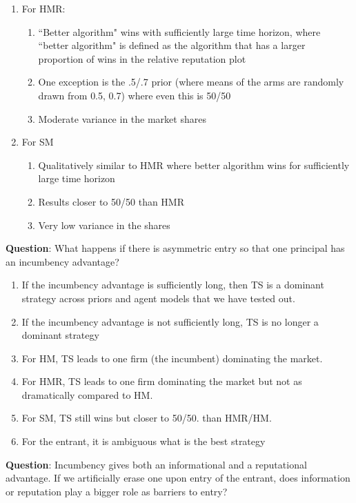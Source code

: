 \documentclass[11pt,letterpaper]{article}
\begin{document}
\begin{enumerate}
\item For HMR:
\begin{enumerate}
\item ``Better algorithm" wins with sufficiently large time horizon, where ``better algorithm" is defined as the algorithm that has a larger proportion of wins in the relative reputation plot
\item One exception is the .5/.7 prior (where means of the arms are randomly drawn from {0.5, 0.7}) where even this is 50/50
\item Moderate variance in the market shares
\end{enumerate}
\item For SM

\begin{enumerate}
\item Qualitatively similar to HMR where better algorithm wins for sufficiently large time horizon
\item Results closer to 50/50 than HMR
\item Very low variance in the shares
\end{enumerate}

\end{enumerate}

\textbf{Question}: What happens if there is asymmetric entry so that one principal has an incumbency advantage?

\begin{enumerate}
\item If the incumbency advantage is sufficiently long, then TS is a dominant strategy across priors and agent models that we have tested out.
\item If the incumbency advantage is not sufficiently long, TS is no longer a dominant strategy
\item For HM, TS leads to one firm (the incumbent) dominating the market.
\item For HMR, TS leads to one firm dominating the market but not as dramatically compared to HM.
\item For SM, TS still wins but closer to 50/50. than HMR/HM.
\item For the entrant, it is ambiguous what is the best strategy
\end{enumerate}

\textbf{Question}: Incumbency gives both an informational and a reputational advantage. If we artificially erase one upon entry of the entrant, does information or reputation play a bigger role as barriers to entry?
\end{document}
